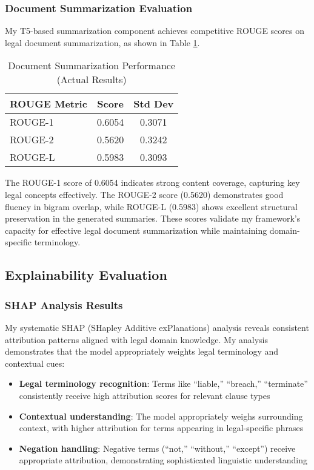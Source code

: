 \subsubsection{Document Summarization Evaluation}
My T5-based summarization component achieves competitive ROUGE scores on legal document summarization, as shown in Table \ref{tab:summarization_results}.

\begin{table}[ht]
\centering
\caption{Document Summarization Performance (Actual Results)}
\label{tab:summarization_results}
\begin{tabular}{|l|c|c|}
\hline
\textbf{ROUGE Metric} & \textbf{Score} & \textbf{Std Dev} \\
\hline
ROUGE-1 & 0.6054 & 0.3071 \\
ROUGE-2 & 0.5620 & 0.3242 \\
ROUGE-L & 0.5983 & 0.3093 \\
\hline
\end{tabular}
\end{table}

The ROUGE-1 score of 0.6054 indicates strong content coverage, capturing key legal concepts effectively. The ROUGE-2 score (0.5620) demonstrates good fluency in bigram overlap, while ROUGE-L (0.5983) shows excellent structural preservation in the generated summaries. These scores validate my framework's capacity for effective legal document summarization while maintaining domain-specific terminology.

\subsection{Explainability Evaluation}
\label{subsec:explainability_evaluation}

\subsubsection{SHAP Analysis Results}
My systematic SHAP (SHapley Additive exPlanations) analysis reveals consistent attribution patterns aligned with legal domain knowledge. My analysis demonstrates that the model appropriately weights legal terminology and contextual cues:

\begin{itemize}
\item \textbf{Legal terminology recognition}: Terms like ``liable,'' ``breach,'' ``terminate'' consistently receive high attribution scores for relevant clause types
\item \textbf{Contextual understanding}: The model appropriately weighs surrounding context, with higher attribution for terms appearing in legal-specific phrases
\item \textbf{Negation handling}: Negative terms (``not,'' ``without,'' ``except'') receive appropriate attribution, demonstrating sophisticated linguistic understanding
\end{itemize}

